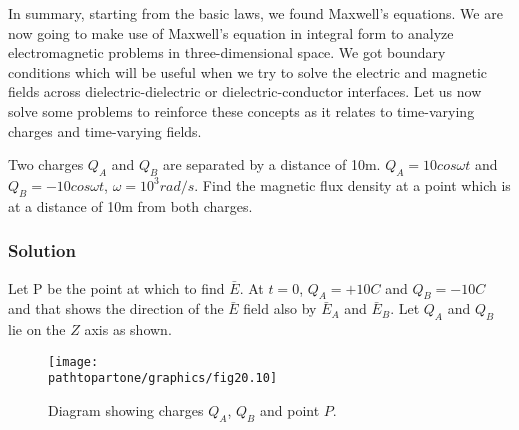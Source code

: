 In summary, starting from the basic laws, we found Maxwell's equations. We are now going to make use of Maxwell's equation in integral form to analyze electromagnetic problems in three-dimensional space. We got boundary conditions which will be useful when we try to solve the electric and magnetic fields across dielectric-dielectric or dielectric-conductor interfaces. Let us now solve some problems to reinforce these concepts as it relates to time-varying charges and time-varying fields.
\begin{exmp}
Two charges $Q_A$ and $Q_B$ are separated by a distance of 10m. $Q_A = 10cos\omega t$ and $Q_B = -10cos\omega t$, $\omega = 10^3 rad/s$. Find the magnetic flux density at a point which is at a distance of 10m from both charges.

\subsubsection*{Solution}
Let P be the point at which to find $\bar{E}$. At $t = 0$, $Q_A = +10C$ and $Q_B = -10C$ and that shows the direction of the $\bar{E}$ field also by $\bar{E}_{A}$ and $\bar{E}_{B}$. Let $Q_A$ and $Q_B$ lie on the $Z$ axis as shown.
\begin{figure}[h]
\centering
\texttt{[image: \\pathtopartone/graphics/fig20.10]}
\caption{Diagram showing charges $Q_A$, $Q_B$ and point $P$.}
\end{figure}


\end{exmp}

